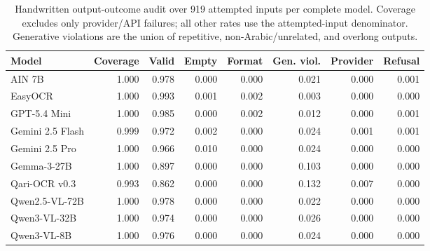 \begin{table}[t]
\centering
\scriptsize
\caption{Handwritten output-outcome audit over 919 attempted inputs per complete model. Coverage excludes only provider/API failures; all other rates use the attempted-input denominator. Generative violations are the union of repetitive, non-Arabic/unrelated, and overlong outputs.}
\label{tab:app_handwritten_outcomes}
\begin{adjustbox}{max width=\textwidth}
\begin{tabular}{lrrrrrrr}
\toprule
\textbf{Model} & \textbf{Coverage} & \textbf{Valid} & \textbf{Empty} & \textbf{Format} & \textbf{Gen. viol.} & \textbf{Provider} & \textbf{Refusal}\\
\midrule
AIN 7B & 1.000 & 0.978 & 0.000 & 0.000 & 0.021 & 0.000 & 0.001\\
EasyOCR & 1.000 & 0.993 & 0.001 & 0.002 & 0.003 & 0.000 & 0.000\\
GPT-5.4 Mini & 1.000 & 0.985 & 0.000 & 0.002 & 0.012 & 0.000 & 0.001\\
Gemini 2.5 Flash & 0.999 & 0.972 & 0.002 & 0.000 & 0.024 & 0.001 & 0.001\\
Gemini 2.5 Pro & 1.000 & 0.966 & 0.010 & 0.000 & 0.024 & 0.000 & 0.000\\
Gemma-3-27B & 1.000 & 0.897 & 0.000 & 0.000 & 0.103 & 0.000 & 0.000\\
Qari-OCR v0.3 & 0.993 & 0.862 & 0.000 & 0.000 & 0.132 & 0.007 & 0.000\\
Qwen2.5-VL-72B & 1.000 & 0.978 & 0.000 & 0.000 & 0.022 & 0.000 & 0.000\\
Qwen3-VL-32B & 1.000 & 0.974 & 0.000 & 0.000 & 0.026 & 0.000 & 0.000\\
Qwen3-VL-8B & 1.000 & 0.976 & 0.000 & 0.000 & 0.024 & 0.000 & 0.000\\
\bottomrule
\end{tabular}
\end{adjustbox}
\end{table}

